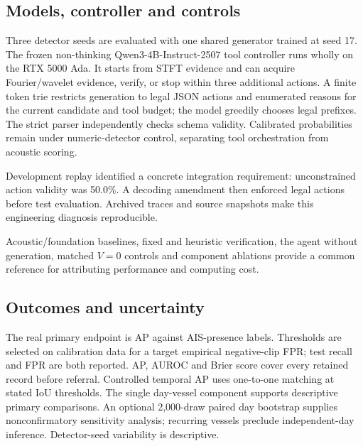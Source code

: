 \documentclass[11pt,letterpaper]{article}
\begin{document}
\subsection{Models, controller and controls}

Three detector seeds are evaluated with one shared generator trained at seed 17. The frozen non-thinking Qwen3-4B-Instruct-2507 \cite{qwen} tool controller runs wholly on the RTX 5000 Ada. It starts from STFT evidence and can acquire Fourier/wavelet evidence, verify, or stop within three additional actions. A finite token trie restricts generation to legal JSON actions and enumerated reasons for the current candidate and tool budget; the model greedily chooses legal prefixes. The strict parser independently checks schema validity. Calibrated probabilities remain under numeric-detector control, separating tool orchestration from acoustic scoring.\par

{\fontsize{9}{11}\selectfont\noindent Development replay identified a concrete integration requirement: unconstrained action validity was 50.0\%. A decoding amendment then enforced legal actions before test evaluation. Archived traces and source snapshots make this engineering diagnosis reproducible.\par}

Acoustic/foundation baselines, fixed and heuristic verification, the agent without generation, matched \(V=0\) controls and component ablations provide a common reference for attributing performance and computing cost.\par

\subsection{Outcomes and uncertainty}

The real primary endpoint is AP against AIS-presence labels. Thresholds are selected on calibration data for a target empirical negative-clip FPR; test recall and FPR are both reported. AP, AUROC and Brier score cover every retained record before referral. Controlled temporal AP uses one-to-one matching at stated IoU thresholds. The single day-vessel component supports descriptive primary comparisons. An optional 2,000-draw paired day bootstrap supplies nonconfirmatory sensitivity analysis; recurring vessels preclude independent-day inference. Detector-seed variability is descriptive.\par

\clearpage
\end{document}

